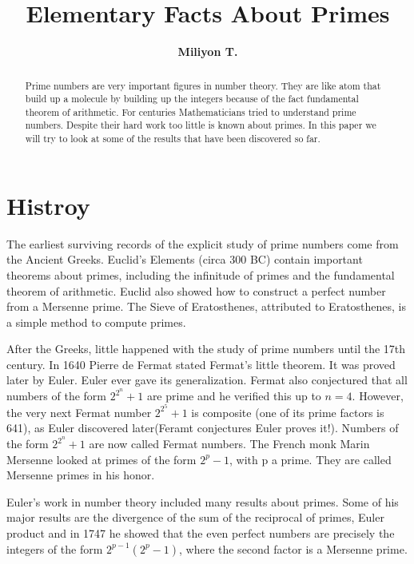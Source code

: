 \documentclass[a4paper,draft]{amsproc}
\title[]{Elementary Facts About Primes}
\author[Miliyon T.]{\bfseries Miliyon T.}
\theoremstyle{plain}
\theoremstyle{definition}
\theoremstyle{remark}
\numberwithin{equation}{section}
\begin{document}
\vspace{18mm} \setcounter{page}{1} \thispagestyle{empty}


\begin{abstract}
Prime numbers are very important figures in number theory. They are like atom that build up a molecule by building up the integers because of the fact fundamental theorem of arithmetic. For centuries Mathematicians tried to understand prime numbers. Despite their hard work too little is known about primes. In this paper we will try to look at some of the results that have been discovered so far.
\end{abstract}

\maketitle

\section{Histroy}  %

The earliest surviving records of the explicit study of prime numbers come from the Ancient Greeks.  Euclid's Elements
(circa 300 BC) contain important theorems about primes, including the infinitude of primes  and the fundamental theorem of arithmetic. Euclid also showed how to construct a perfect number  from a  Mersenne prime. The Sieve of Eratosthenes,
attributed to Eratosthenes, is a simple method to compute primes.

After the Greeks, little happened with the study of prime numbers until the 17th century. In 1640 Pierre de Fermat
stated Fermat's little theorem. It was proved later by Euler. Euler ever gave its generalization. Fermat also conjectured that all numbers of the form $2^{2^n} + 1$ are prime and he verified this up to $n = 4$. However, the very next Fermat number $2^{2^5} + 1$ is composite (one of its prime factors is 641), as Euler discovered later(Feramt conjectures Euler proves it!). Numbers of the form $2^{2^n} + 1$ are now called Fermat numbers. The French monk  Marin Mersenne looked at primes of the form $2^p -1$, with p a prime. They are called Mersenne primes in his honor.

Euler's work in number theory included many results about primes. Some of his major results are the divergence of the sum of the reciprocal of primes, Euler product and  in 1747 he showed that the even  perfect numbers are precisely the integers of the form $2^{p -1}(2^p -1)$, where the second factor is a Mersenne prime.
\end{document}
